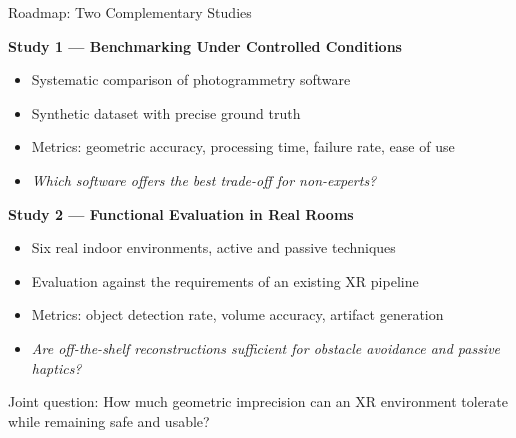 \documentclass[aspectratio=169, 12pt]{beamer}
\begin{document}
\begin{frame}{Roadmap: Two Complementary Studies}
	{\color{gray}
	\textbf{Study 1 — Benchmarking Under Controlled Conditions}
	
	\begin{itemize}
		\item Systematic comparison of photogrammetry software
		\item Synthetic dataset with precise ground truth
		\item Metrics: geometric accuracy, processing time, failure rate, ease of use
		\item \textit{Which software offers the best trade-off for non-experts?}
	\end{itemize}
	}
	
	\vspace{0.3cm}
	
	\textbf{\textcolor{gbAqua}{Study 2 — Functional Evaluation in Real Rooms}}
	
	\begin{itemize}
		\item Six real indoor environments, active and passive techniques
		\item Evaluation against the requirements of an existing XR pipeline
		\item Metrics: object detection rate, volume accuracy, artifact generation
		\item \textit{Are off-the-shelf reconstructions sufficient for obstacle avoidance and passive haptics?}
	\end{itemize}
	
	\vspace{0.2cm}
	
	\alert{Joint question:} How much geometric imprecision can an XR environment tolerate while remaining safe and usable?
\end{frame}
\end{document}
